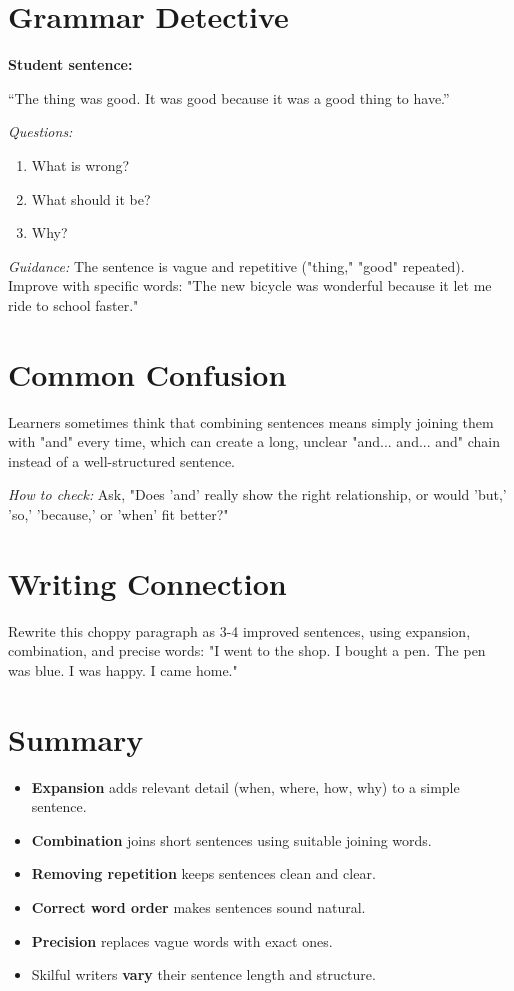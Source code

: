 \section{Grammar Detective}
\begin{detectivebox}
\textbf{Student sentence:}

``The thing was good. It was good because it was a good thing to have.''

\textit{Questions:}
\begin{enumerate}
    \item What is wrong?
    \item What should it be?
    \item Why?
\end{enumerate}

\textit{Guidance:} The sentence is vague and repetitive ("thing," "good" repeated). Improve with specific words: "The new bicycle was wonderful because it let me ride to school faster."
\end{detectivebox}

\section{Common Confusion}
\begin{warningbox}
Learners sometimes think that combining sentences means simply joining them with "and" every time, which can create a long, unclear "and... and... and" chain instead of a well-structured sentence.

\textit{How to check:} Ask, "Does 'and' really show the right relationship, or would 'but,' 'so,' 'because,' or 'when' fit better?"
\end{warningbox}

\section{Writing Connection}
Rewrite this choppy paragraph as 3-4 improved sentences, using expansion, combination, and precise words: "I went to the shop. I bought a pen. The pen was blue. I was happy. I came home."

\section{Summary}
\begin{summarybox}
\begin{itemize}
    \item \textbf{Expansion} adds relevant detail (when, where, how, why) to a simple sentence.
    \item \textbf{Combination} joins short sentences using suitable joining words.
    \item \textbf{Removing repetition} keeps sentences clean and clear.
    \item \textbf{Correct word order} makes sentences sound natural.
    \item \textbf{Precision} replaces vague words with exact ones.
    \item Skilful writers \textbf{vary} their sentence length and structure.
\end{itemize}
\end{summarybox}

